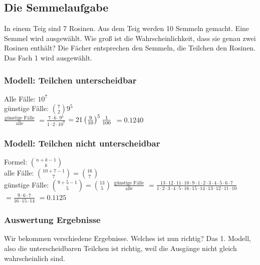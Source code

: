\renewcommand{\ldate}{2015-10-26}

\subsection{Die Semmelaufgabe} %
In einem Teig sind 7 Rosinen. Aus dem Teig werden 10 Semmeln gemacht. Eine Semmel wird ausgewählt. Wie groß ist die Wahrscheinlichkeit, dass sie genau zwei Rosinen enthält?  Die Fächer entsprechen den Semmeln, die Teilchen den Rosinen. Das Fach 1 wird ausgewählt. 

\subsubsection{Modell: Teilchen unterscheidbar}
Alle Fälle: $10^7$\\
günstige Fälle: $\binom{7}{2} 9^5$\\
$ \frac{\textrm{günstige Fälle}}{\textrm{alle}} $
$= \frac{7\cdot 6\cdot 9^5}{1\cdot 2\cdot 10^7} $
$= 21  \left( \frac{9}{10} \right) ^5 \frac{1}{100}$
$= 0.1240 $

\subsubsection{Modell: Teilchen nicht unterscheidbar}
Formel: $\binom{n+k-1}{k}$\\
alle Fälle: $\binom{10+7-1}{7} = \binom{16}{7}$\\
günstige Fälle: $\binom{9+5-1}{5} = \binom{13}{5}$
$ \frac{\textrm{günstige Fälle}}{\textrm{alle}} $
$= \frac{13\cdot 12\cdot 11\cdot 10\cdot 9\cdot 1\cdot 2\cdot 3\cdot 4\cdot 5\cdot 6\cdot 7}{1\cdot 2\cdot 3\cdot 4\cdot 5\cdot 16 \cdot 15 \cdot 14 \cdot 13 \cdot 12\cdot 11\cdot 10}$
$= \frac{9\cdot 6\cdot 7}{16\cdot 15\cdot 14}$
$= 0.1125$

\subsubsection{Auswertung Ergebnisse}
Wir bekommen verschiedene Ergebnisse. Welches ist nun richtig? Das 1. Modell, also die unterscheidbaren Teilchen ist richtig, weil die Ausgänge nicht gleich wahrscheinlich sind. 

